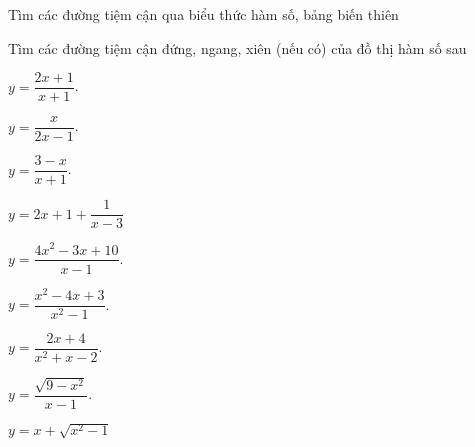 \begin{dang}{Tìm các đường tiệm cận qua biểu thức hàm số, bảng biến thiên}
\end{dang}
\begin{vd} Tìm các đường tiệm cận đứng, ngang, xiên (nếu có) của đồ thị hàm số sau
    \begin{listEX}[3]
        \item $y=\dfrac{2x+1}{x+1}$.
        \item $y=\dfrac{x}{2x-1}$.
        \item $y=\dfrac{3-x}{x+1}$.
        \item $y=2x+1+\dfrac{1}{x-3}$
        \item $y=\dfrac{4x^2-3x+10}{x-1}$.
        \item $y=\dfrac{x^2-4x+3}{x^2-1}$.
        \item $y=\dfrac{2x+4}{x^2+x-2}$.
        \item $y=\dfrac{\sqrt{9-x^2}}{x-1}$.
        \item $y=x+\sqrt{x^2-1}$
    \end{listEX}
    \loigiai{}
\end{vd}

